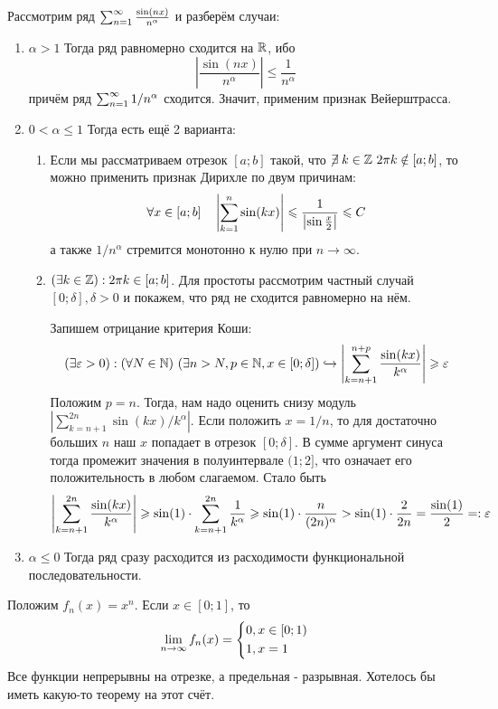 \begin{example}
	Рассмотрим ряд $\sum_{n = 1}^\infty \frac{\sin (nx)}{n^\alpha}$ и разберём случаи:
	\begin{enumerate}
		\item $\alpha > 1$ Тогда ряд равномерно сходится на $\mathbb{R}$, ибо
		\[
			\left|\frac{\sin (nx)}{n^\alpha}\right| \le \frac{1}{n^\alpha}
		\]
		причём ряд $\sum_{n = 1}^\infty 1/n^\alpha$ сходится. Значит, применим признак Вейерштрасса.
		
		\item $0 < \alpha \le 1$ Тогда есть ещё 2 варианта:
		\begin{enumerate}
			\item Если мы рассматриваем отрезок $[a; b]$ такой, что $\centernot\exists k \in \Z\  2\pi k \notin [a; b]$, то можно применить признак Дирихле по двум причинам:
			\[
				\forall x \in [a; b] \quad \left|\sum\limits_{k = 1}^n \sin (kx)\right| \leqslant \frac{1}{\left|\sin \frac{x}{2}\right|} \leqslant C
			\]
			а также $1/n^\alpha$ стремится монотонно к нулю при $n \to \infty$.
			
			\item $(\exists k \in \mathbb{Z}) : 2\pi k \in [a; b]$. Для простоты рассмотрим частный случай $[0; \delta], \delta > 0$ и покажем, что ряд не сходится равномерно на нём.
			
			Запишем отрицание критерия Коши:
			\[
				(\exists \varepsilon > 0) : (\forall N \in \mathbb{N})\ ( \exists n > N, p \in \mathbb{N}, x \in [0; \delta]) \hookrightarrow \left|\sum\limits_{k = n + 1}^{n + p} \frac{\sin (kx)}{k^\alpha}\right| \geqslant \varepsilon
			\]
			Положим $p = n$. Тогда, нам надо оценить снизу модуль \(|\sum_{k = n + 1}^{2n} \sin(kx)/k^\alpha|\). Если положить $x = 1/n$, то для достаточно больших $n$ наш $x$ попадает в отрезок $[0; \delta]$. В сумме аргумент синуса тогда промежит значения в полуинтервале $(1; 2]$, что означает его положительность в любом слагаемом. Стало быть
			\[
				\left|\sum\limits_{k = n + 1}^{2n} \frac{\sin (kx)}{k^\alpha}\right| \geqslant \sin (1) \cdot \sum\limits_{k = n + 1}^{2n} \frac{1}{k^\alpha} \geqslant \sin(1) \cdot \frac{n}{(2n)^\alpha} > \sin(1) \cdot \frac{2}{2n} = \frac{\sin(1)}{2} =: \varepsilon
			\]
		\end{enumerate}
	
		\item $\alpha \le 0$ Тогда ряд сразу расходится из расходимости функциональной последовательности.
	\end{enumerate}
\end{example}

\begin{example}
	Положим $f_n(x) = x^n$. Если $x \in [0; 1]$, то
	\[
		\lim\limits_{n \to \infty} f_n(x) = \left\{\begin{aligned}
			&{0, x \in [0; 1)}
			\\
			&{1, x = 1}
		\end{aligned}\right.
	\]
	Все функции непрерывны на отрезке, а предельная - разрывная. Хотелось бы иметь какую-то теорему на этот счёт.
\end{example}

